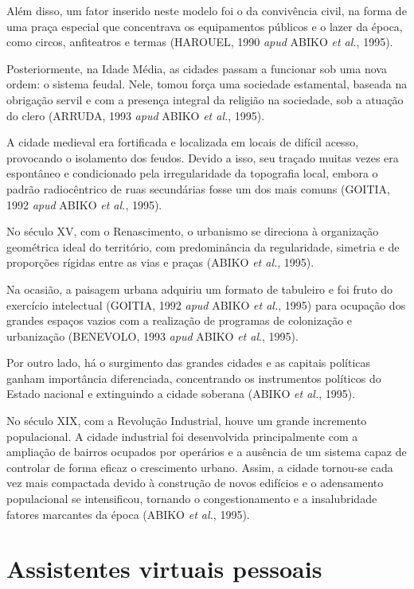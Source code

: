 Além disso, um fator inserido neste modelo foi o da convivência civil, na forma de uma praça especial que concentrava os equipamentos públicos e o lazer da época, como circos, anfiteatros e termas (HAROUEL, 1990 \textit{apud} ABIKO \textit{et al.}, 1995).

Posteriormente, na Idade Média, as cidades passam a funcionar sob uma nova ordem: o sistema feudal. Nele, tomou força uma sociedade estamental, baseada na obrigação servil e com a presença integral da religião na sociedade, sob a atuação do clero (ARRUDA, 1993 \textit{apud} ABIKO \textit{et al.}, 1995).

A cidade medieval era fortificada e localizada em locais de difícil acesso, provocando o isolamento dos feudos. Devido a
isso, seu traçado muitas vezes era espontâneo e condicionado pela irregularidade da topografia local, embora o padrão radiocêntrico de ruas secundárias fosse um dos mais comuns (GOITIA, 1992 \textit{apud} ABIKO \textit{et al.}, 1995).

No século XV, com o Renascimento, o urbanismo se direciona à organização geométrica ideal do território, com predominância da regularidade, simetria e de proporções rígidas entre as vias e praças (ABIKO \textit{et al.}, 1995).

Na ocasião, a paisagem urbana adquiriu um formato de tabuleiro e foi fruto do exercício intelectual (GOITIA, 1992 \textit{apud} ABIKO \textit{et al.}, 1995) para ocupação dos grandes espaços vazios com a realização de programas de colonização e urbanização (BENEVOLO, 1993 \textit{apud} ABIKO \textit{et al}., 1995).

Por outro lado, há o surgimento das grandes cidades e as capitais políticas ganham importância diferenciada, concentrando os instrumentos políticos do Estado nacional e extinguindo a cidade soberana (ABIKO \textit{et al.}, 1995).

No século XIX, com a Revolução Industrial, houve um grande incremento populacional. A cidade industrial foi desenvolvida principalmente com a ampliação de bairros ocupados por operários e a ausência de um sistema capaz de controlar de forma eficaz o crescimento urbano. Assim, a cidade tornou-se cada vez mais compactada devido à construção de novos edifícios e o adensamento populacional se intensificou, tornando o congestionamento e a insalubridade fatores marcantes da época (ABIKO \textit{et al.}, 1995).

\section{Assistentes virtuais pessoais} \label{s:assistentes_virtuais_pessoais}

